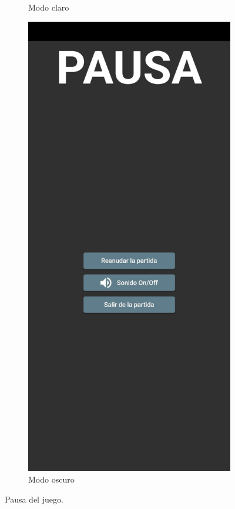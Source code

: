 \documentclass{article}
\begin{document}
\begin{figure}[H]
\begin{subfigure}{0.5\textwidth}
          \caption{Modo claro}
  \end{subfigure}
  \begin{subfigure}{0.5\textwidth}
          \includegraphics[width=\textwidth]{imagenes/captura3dark.jpeg}
          \caption{Modo oscuro}
  \end{subfigure}
  \caption{Pausa del juego.}
\end{figure}
\end{document}
